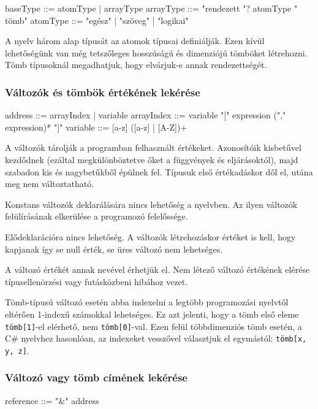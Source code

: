 \begin{ebnf}
baseType ::= atomType | arrayType
arrayType ::= "rendezett "? atomType " tömb"
atomType ::= "egész" | "szöveg" | "logikai"
\end{ebnf}

A nyelv három alap típusát az atomok típusai definiálják. Ezen kívül lehetőségünk van még tetszőleges hosszúságú és dimenziójú tömböket létrehozni. Tömb típusoknál megadhatjuk, hogy elvárjuk-e annak rendezettségét.

\subsubsection{Változók és tömbök értékének lekérése}

\begin{ebnf}
address ::= arrayIndex | variable
arrayIndex ::= variable "[" expression ("," expression)* "]"
variable ::= [a-z] ([a-z] | [A-Z])+
\end{ebnf}

A változók tárolják a programban felhasznált értékeket. Azonosítóik kisbetűvel kezdődnek (ezáltal megkülönböztetve őket a függvények és eljárásoktól), majd szabadon kis és nagybetűkből épülnek fel. Típusuk első értékadáskor dől el, utána meg nem változtatható. 

Konstans változók deklarálására nincs lehetőség a nyelvben. Az ilyen változók felülírásának elkerülése a programozó felelőssége.

Elődeklarációra nincs lehetőség. A változók létrehozáskor értéket is kell, hogy kapjanak így se null érték, se üres változó nem lehetséges.

A változó értékét annak nevével érhetjük el. Nem létező változó értékének elérése típusellenörzési vagy futásközbeni hibához vezet.

Tömb-típusú változó esetén abba indexelni a legtöbb programozási nyelvtől eltérően 1-indexű számokkal lehetséges. Ez azt jelenti, hogy a tömb első eleme \texttt{tömb[1]}-el elérhető, nem \texttt{tömb[0]}-val. Ezen felül többdimenziós tömb esetén, a C\# nyelvhez hasonlóan, az indexeket vesszővel választjuk el egymástól: \texttt{tömb[x, y, z]}.

\subsubsection{Változó vagy tömb címének lekérése}

\begin{ebnf}
reference ::= "&" address
\end{ebnf}

